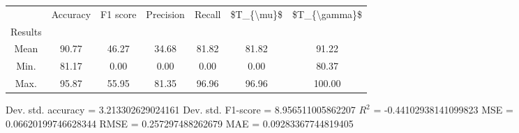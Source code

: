 \begin{tabular}{|c|c|c|c|c|c|c|}
\toprule
{} &  Accuracy &  F1 score &  Precision &  Recall &  \$T\_\{\textbackslash mu\}\$ &  \$T\_\{\textbackslash gamma\}\$ \\
Results &           &           &            &         &            &               \\
\hline
Mean    &     90.77 &     46.27 &      34.68 &   81.82 &      81.82 &         91.22 \\
Min.    &     81.17 &      0.00 &       0.00 &    0.00 &       0.00 &         80.37 \\
Max.    &     95.87 &     55.95 &      81.35 &   96.96 &      96.96 &        100.00 \\
\bottomrule
\end{tabular}

 Dev. std. accuracy = 3.213302629024161
 Dev. std. F1-score = 8.956511005862207
 $R^2$ = -0.44102938141099823
 MSE = 0.06620199746628344
 RMSE = 0.257297488262679
 MAE = 0.09283367744819405